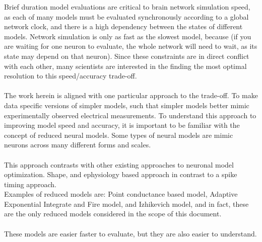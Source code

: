 Brief duration model evaluations are critical to brain network simulation speed, as each of many models must be evaluated synchronously according to a global network clock, and there is a high dependency between the states of different models. Network simulation is only as fast as the slowest model, because (if you are waiting for one neuron to evaluate, the whole network will need to wait, as its state may depend on that neuron). Since these constraints are in direct conflict with each other, many scientists are interested in the finding the most optimal resolution to this speed/accuracy trade-off.\\ 
\\
The work herein is aligned with one particular approach to the trade-off. To make data specific versions of simpler models, such that simpler models better mimic experimentally observed electrical measurements. To understand this approach to improving model speed and accuracy, it is important to be familiar with the concept of reduced neural models. Some types of neural models are mimic neurons across many different forms and scales.\\
\\
This approach contrasts with other existing approaches to neuronal model optimization. Shape, and ephysiology based approach in contrast to a spike timing approach. 
\\
Examples of reduced models are:
Point conductance based model, Adaptive Exponential Integrate and Fire model, and Izhikevich model, and in fact, these are the only reduced models considered in the scope of this document.\\
\\
These models are easier faster to evaluate, but they are also easier to understand.

